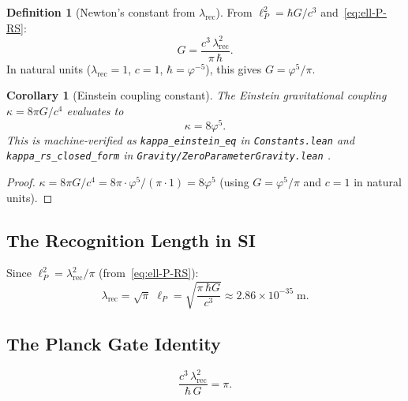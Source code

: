 \documentclass[12pt]{article}
\newtheorem{corollary}[theorem]{Corollary}
\theoremstyle{definition}
\newtheorem{definition}[theorem]{Definition}
\theoremstyle{remark}
\begin{document}
\begin{definition}[Newton's constant from $\lambda_{\mathrm{rec}}$]
\label{def:G-def}
From $\ell_P^2 = \hbar G/c^3$ and~\eqref{eq:ell-P-RS}:
\begin{equation}
  \boxed{
    G = \frac{c^3\, \lambda_{\mathrm{rec}}^2}{\pi\,\hbar}.
  }
  \label{eq:G-derived}
\end{equation}
In natural units ($\lambda_{\mathrm{rec}} = 1$, $c = 1$,
$\hbar = \varphi^{-5}$), this gives $G = \varphi^5/\pi$.
\end{definition}

\begin{corollary}[Einstein coupling constant]
\label{cor:kappa}
The Einstein gravitational coupling
$\kappa = 8\pi G/c^4$ evaluates to
\begin{equation}
  \boxed{\kappa = 8\varphi^5.}
  \label{eq:kappa}
\end{equation}
This is machine-verified as \texttt{kappa\_einstein\_eq} in
\texttt{Constants.lean} and \texttt{kappa\_rs\_closed\_form} in
\texttt{Gravity/ZeroParameterGravity.lean}
\cite{WashburnLean4Repo2026}.
\end{corollary}

\begin{proof}
$\kappa = 8\pi G/c^4 = 8\pi \cdot
\varphi^5/(\pi \cdot 1) = 8\varphi^5$
(using $G = \varphi^5/\pi$ and $c = 1$ in natural units).
\end{proof}

\subsection{The Recognition Length in SI}

Since $\ell_P^2 = \lambda_{\mathrm{rec}}^2/\pi$
(from~\eqref{eq:ell-P-RS}):
\begin{equation}
  \boxed{
    \lambda_{\mathrm{rec}}
    = \sqrt{\pi}\;\ell_P
    = \sqrt{\frac{\pi\,\hbar G}{c^3}}
    \approx 2.86 \times 10^{-35}\;\mathrm{m}.
  }
  \label{eq:lambda-rec}
\end{equation}

\subsection{The Planck Gate Identity}

\begin{equation}
  \boxed{
    \frac{c^3\,\lambda_{\mathrm{rec}}^2}{\hbar\,G}
    = \pi.
  }
  \label{eq:planck-gate}
\end{equation}
\end{document}
